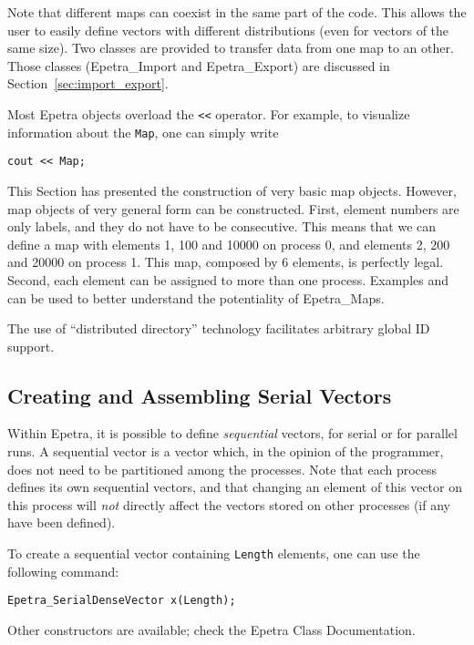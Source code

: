 \smallskip

Note that different maps can coexist in the same part of the code. This
allows the user to easily define vectors with different distributions
(even for vectors of the same size).  Two classes are provided to
transfer data from one map to an other. Those classes (Epetra\_Import
and Epetra\_Export) are discussed in Section~\ref{sec:import_export}.

\begin{remark}
Most Epetra objects overload the \verb!<<! operator. For example, to
visualize information about the \verb!Map!, one can simply write
\begin{verbatim}
cout << Map;
\end{verbatim}
\end{remark}

This Section has presented the construction of very basic map objects.
However, map objects of very general form can be constructed. First,
element numbers are only labels, and they do not have to be consecutive.
This means that we can define a map with elements 1, 100 and 10000 on
process 0, and elements 2, 200 and 20000 on process 1. This map,
composed by 6 elements, is perfectly legal. Second, each element can be
assigned to more than one process. Examples  and
 can be used to better understand the potentiality
of Epetra\_Maps.

\begin{remark}
  The use of ``distributed directory'' technology facilitates arbitrary
  global ID support.
\end{remark}


\subsection{Creating and Assembling Serial Vectors}
\label{sec:serial_vec}

Within Epetra, it is possible to define {\em sequential} vectors, for
serial or for parallel runs. A sequential vector is a vector which, in
the opinion of the programmer, does not need to be partitioned among the
processes.  Note that each process defines its own sequential vectors,
and that changing an element of this vector on this process will {\em
  not} directly affect the vectors stored on other processes (if any
have been defined).

To create a sequential vector containing {\tt Length} elements, one can
use the following command:
\begin{verbatim}
Epetra_SerialDenseVector x(Length);
\end{verbatim}
Other constructors are available; check the Epetra Class
Documentation.

